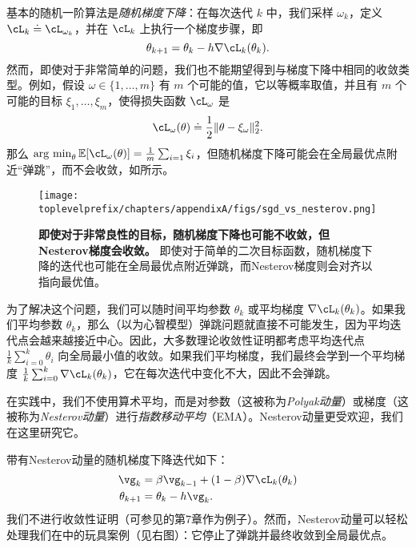\documentclass[../../book-main_zh.tex]{subfiles}
\begin{document}
基本的随机一阶算法是\textit{随机梯度下降}：在每次迭代 \(k\) 中，我们采样 \(\omega_{k}\)，定义 \(\cL_{k} \doteq \cL_{\omega_{k}}\)，并在 \(\cL_{k}\) 上执行一个梯度步骤，即
\begin{equation}
    \theta_{k + 1} = \theta_{k} - h\nabla \cL_{k}(\theta_{k}).
\end{equation}
然而，即使对于非常简单的问题，我们也不能期望得到与梯度下降中相同的收敛类型。例如，假设 \(\omega \in \{1, \dots, m\}\) 有 \(m\) 个可能的值，它以等概率取值，并且有 \(m\) 个可能的目标 \(\xi_{1}, \dots, \xi_{m}\)，使得损失函数 \(\cL_{\omega}\) 是
\begin{equation}
    \cL_{\omega}(\theta) \doteq \frac{1}{2}\norm{\theta - \xi_{\omega}}_{2}^{2}.
\end{equation}
那么 \(\argmin_{\theta}\Ex[\cL_{\omega}(\theta)] = \frac{1}{m}\sum_{i = 1}\xi_{i}\)，但随机梯度下降可能会在全局最优点附近“弹跳”，而不会收敛，如所示。

\begin{figure}
    \texttt{[image: \\toplevelprefix/chapters/appendixA/figs/sgd\_vs\_nesterov.png]}
    \centering 
    \caption{\small\textbf{即使对于非常良性的目标，随机梯度下降也可能不收敛，但Nesterov梯度会收敛。} 即使对于简单的二次目标函数，随机梯度下降的迭代也可能在全局最优点附近弹跳，而Nesterov梯度则会对齐以指向最优值。}
    \label{fig:sgd_nonconvergence}
\end{figure}

为了解决这个问题，我们可以随时间平均参数 \(\theta_{k}\) 或平均梯度 \(\nabla \cL_{k}(\theta_{k})\)。如果我们平均参数 \(\theta_{k}\)，那么（以为心智模型）弹跳问题就直接不可能发生，因为平均迭代点会越来越接近中心。因此，大多数理论收敛性证明都考虑平均迭代点 \(\frac{1}{k}\sum_{i = 0}^{k}\theta_{i}\) 向全局最小值的收敛。如果我们平均梯度，我们最终会学到一个平均梯度 \(\frac{1}{k}\sum_{i = 0}^{k}\nabla \cL_{k}(\theta_{k})\)，它在每次迭代中变化不大，因此不会弹跳。

在实践中，我们不使用算术平均，而是对参数（这被称为\textit{Polyak动量}）或梯度（这被称为\textit{Nesterov动量}）进行\textit{指数移动平均}（EMA）。Nesterov动量更受欢迎，我们在这里研究它。

带有Nesterov动量的随机梯度下降迭代如下：
\begin{align}
    \vg_{k}
    &= \beta\vg_{k - 1} + (1 - \beta)\nabla \cL_{k}(\theta_{k}) \\ 
    \theta_{k + 1}
    &= \theta_{k} - h\vg_{k}.
\end{align}
我们不进行收敛性证明（可参见\cite{garrigos2023handbook}的第7章作为例子）。然而，Nesterov动量可以轻松处理我们在中的玩具案例（见右图）：它停止了弹跳并最终收敛到全局最优点。
\end{document}

